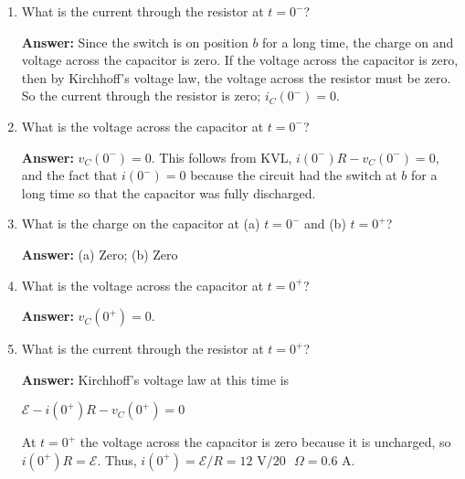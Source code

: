 \documentclass{article}
\begin{document}
\begin{enumerate}

  \item What is the current through the resistor at $t=0^-$?

        \ifsolutions
        {\bf Answer: } Since the switch is on position $b$ for a long time, the charge on and voltage across the capacitor is zero. If the voltage across the capacitor is zero, then by Kirchhoff's voltage law, the voltage across the resistor must be zero. So the current through the resistor is zero; $i_C(0^-)=0$.
        \else
        \vskip 56.25pt
        \fi
        \ifsolutions\else
        \vskip 56.25pt
        \fi

  \item What is the voltage across the capacitor at $t=0^-$?

        \ifsolutions
        {\bf Answer: } $v_C(0^-)=0$. This follows from KVL, $i(0^-)R-v_C(0^-)=0$, and the fact that $i(0^-)=0$ because the circuit had the switch at $b$ for a long time so that the capacitor was fully discharged.
        \else
        \vskip 56.25pt
        \fi
        \ifsolutions\else
        \vskip 56.25pt
        \fi

  \item What is the charge on the capacitor at (a) $t=0^-$ and (b) $t=0^+$?

        \ifsolutions
        {\bf Answer: } (a) Zero; (b) Zero
        \else
        \vskip 56.25pt
        \fi
        \ifsolutions\else
        \vskip 56.25pt
        \fi

  \item What is the voltage across the capacitor at $t=0^+$?

        \ifsolutions
        {\bf Answer: } $v_C(0^+)=0$.
        \else
        \vskip 56.25pt
        \fi
        \ifsolutions\else
        \vskip 56.25pt
        \fi

  \item What is the current through the resistor at $t=0^+$?

        \ifsolutions
        {\bf Answer:} Kirchhoff's voltage law at this time is

        $\mathcal{E}-i(0^+)R-v_C(0^+)=0$

        At $t=0^+$ the voltage across the capacitor is zero because it is uncharged, so $i(0^+)R=\mathcal{E}$. Thus, $i(0^+) = \mathcal{E}/R = 12\text{ V}/20\text{ }\Omega = 0.6\text{ A}$.
        \else
        \vskip 56.25pt
        \fi
        \ifsolutions\else
        \vskip 56.25pt
        \fi


\end{enumerate}
\end{document}
